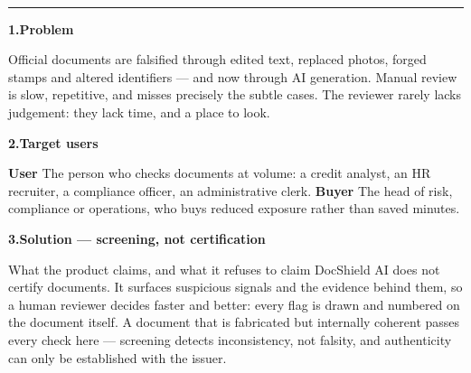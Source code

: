 \documentclass[10pt,a4paper]{article}
\newcommand{\heading}[2]{%
  \par\vspace{5pt}%
  {\color{navy}\bfseries #1\hspace{6pt}#2}%
  \par\vspace{-2pt}%
}
\newcommand{\lead}[1]{\textbf{\color{navy}#1}}
\begin{document}
\noindent
\begin{minipage}[b]{\linewidth}
  \colorbox{navy}{}%
  \\[3pt]
\end{minipage}

\vspace{5pt}
\textcolor{navy}{\rule{\linewidth}{1pt}}

\heading{1.}{Problem}

Official documents are falsified through edited text, replaced photos, forged
stamps and altered identifiers --- and now through AI generation. Manual review
is slow, repetitive, and misses precisely the subtle cases. The reviewer rarely
lacks judgement: they lack time, and a place to look.

\heading{2.}{Target users}

\lead{User} The person who checks documents at volume: a credit analyst, an HR
recruiter, a compliance officer, an administrative clerk.
\lead{Buyer} The head of risk, compliance or operations, who buys reduced
exposure rather than saved minutes.

\heading{3.}{Solution --- screening, not certification}

\vspace{2pt}
\begin{note}{What the product claims, and what it refuses to claim}
DocShield AI does not certify documents. It surfaces suspicious signals and the
evidence behind them, so a human reviewer decides faster and better: every flag
is drawn and numbered on the document itself. A document that is fabricated but
internally coherent passes every check here --- screening detects inconsistency,
not falsity, and authenticity can only be established with the issuer.
\end{note}
\end{document}
